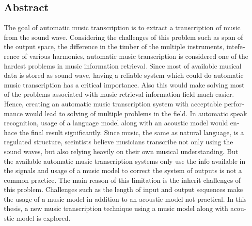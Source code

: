 \begin{latin}
\chapter*{Abstract}
The goal of automatic music transcription is to extract a transcription of music
from the sound wave. Considering the challenges of this problem such as span of
the output space, the difference in the timber of the multiple instruments,
inteference of various harmonies, automatic music transcription is considered
one of the hardest problems in music information retrieval. Since most of
available musical data is stored as sound wave, having a reliable system which
could do automatic music transcription has a critical importance. Also this
would make solving most of the problems associated with music retrieval
information field much easier. Hence, creating an automatic music transcription
system with acceptable performance would lead to solving of multiple problems in
the field. In automatic speak recognition, usage of a language model along with
an acoustic model would enhace the final result significantly. Since music, the
same as natural language, is a regulated structure, sceintists believe musicians
transcribe not only using the sound waves, but also relying heavily on their own
musical understanding. But the available automatic music transcription systems
only use the info available in the signals and usage of a music model to correct
the system of outputs is not a common practice. The main reason of this
limitation is the inherit challenges of this problem. Challenges such as the
length of input and output sequences make the usage of a music model in addition
to an acoustic model not practical. In this thesis, a new music transcription
technique using a music model along with acoustic model is explored. 
\end{latin}